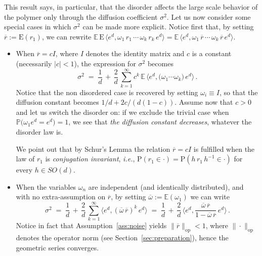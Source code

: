 \documentclass[a4paper,reqno,11pt]{amsart}
\numberwithin{equation}{section}
\newcommand{\bbE}{{\ensuremath{\mathbb E}} }
\newcommand{\bbP}{{\ensuremath{\mathbb P}} }
\newcommand{\gs}{\sigma}
\newcommand{\go}{\omega}
\def\bP{\ensuremath{\bs{\mathrm{P}}}}
\def\bE{\ensuremath{\bs{\mathrm{E}}}}
\def\bs{\boldsymbol}
\newcommand{\rbar}{\overline{r}}
\begin{document}
This result says, in particular, that the disorder affects the large 
scale behavior of the polymer only through the diffusion coefficient $\gs^2$.
Let us now consider some special cases in which $\gs^2$ can be made more explicit.
Notice first that, by setting $\rbar := \bE(r_1)$, we can rewrite
$\bbE  \, \bE \, \langle e^d , \go_1 \, r_1 \, \cdots \, \go_k \, r_k  \, e^d \rangle
= \bbE  \, \langle e^d , \go_1 \, \rbar \, \cdots \, \go_k \, \rbar \, e^d \rangle$.
\begin{itemize}

\item When $\overline r = c I$, where $I$
denotes the identity matrix and $c$ is a constant
(necessarily $|c| < 1$), the expression for $\gs^2$ becomes
\begin{equation}
	\gs^2 \;=\; \frac 1d \,+\, \frac 2d \,
	\sum_{k=1}^\infty c^k \, \bbE \, \big\langle e^d , 
	\big( \go_1 \cdots \go_k \big) \, e^d \big\rangle\,.
\end{equation} 
Notice that the non disordered case is recovered by setting
$\go_i \equiv I$, so that the diffusion constant
becomes $1/d + 2c/ (d(1-c))$. 
Assume now that $c > 0$ and let us switch the disorder on:
if we exclude the trivial case
when $\bbP \big( \go_1 e^d = e^d \big) = 1$,
we see that {\sl the diffusion constant decreases},
whatever the disorder law is.

We point out that by Schur's Lemma the relation $\overline r = cI$ is
fulfilled when the law of $r_1$ is {\sl conjugation invariant},
{\sl i.e.}, $\bP(r_1 \in \cdot) = \bP(h\, r_1\, h^{-1} \in \cdot)$
for every $h \in SO(d)$.

\item \rule{0pt}{1.15em}When the variables $\go_n$ are independent (and identically
distributed), and with no extra-assumption on $\overline r$,
by setting $\overline \go := \bbE(\go_1)$ we can write
\begin{equation}
	\gs^2 \;=\; \frac 1d \,+\, \frac 2d \, \sum_{k=1}^\infty
	\big\langle e^d , ( \overline{\go} \, \overline{r} )^k \, e^d \big\rangle
	\;=\; \frac 1d \,+\, \frac 2d \, 
	\bigg\langle e^d , \frac{\overline{\go} \, \overline{r}}
	{1 - \overline{\go} \, \overline{r}} \, e^d \bigg\rangle\,.
\end{equation}
Notice in fact that Assumption~\ref{ass:noise}
yields $\| \overline{r} \|_{\text{op}} < 1$, where
$\| \cdot \|_{\text{op}}$ denotes the operator norm
(see Section~\ref{sec:preparation}), hence the geometric series
converges.

\end{itemize}
\end{document}
